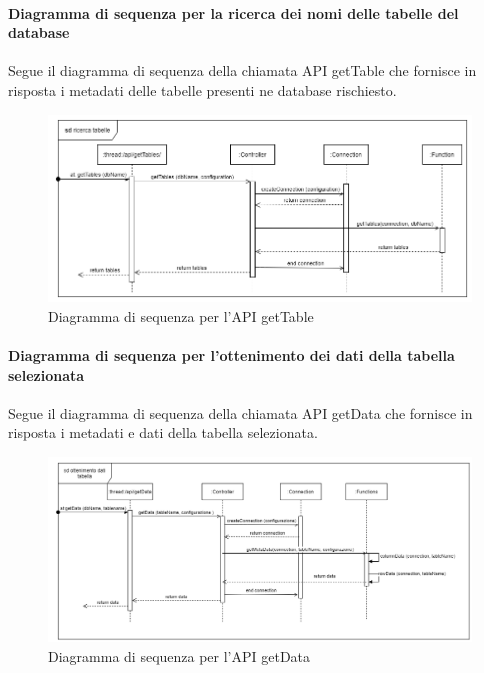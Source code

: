     \paragraph{Diagramma di sequenza per la ricerca dei nomi delle tabelle del database}
        Segue il diagramma di sequenza della chiamata API getTable che fornisce in risposta i metadati delle tabelle presenti ne database rischiesto.
            \begin{figure}[H]
                \centering\includegraphics[width=1\textwidth]{source/img/API_getTable.png}
                \caption{Diagramma di sequenza per l'API getTable}
            \end{figure}
            
    \paragraph{Diagramma di sequenza per l'ottenimento dei dati della tabella selezionata}
    Segue il diagramma di sequenza della chiamata API getData che fornisce in risposta i metadati e dati della tabella selezionata.
            \begin{figure}[H]
                \centering\includegraphics[width=1\textwidth]{source/img/API_getData.png}
                \caption{Diagramma di sequenza per l'API getData}
            \end{figure}